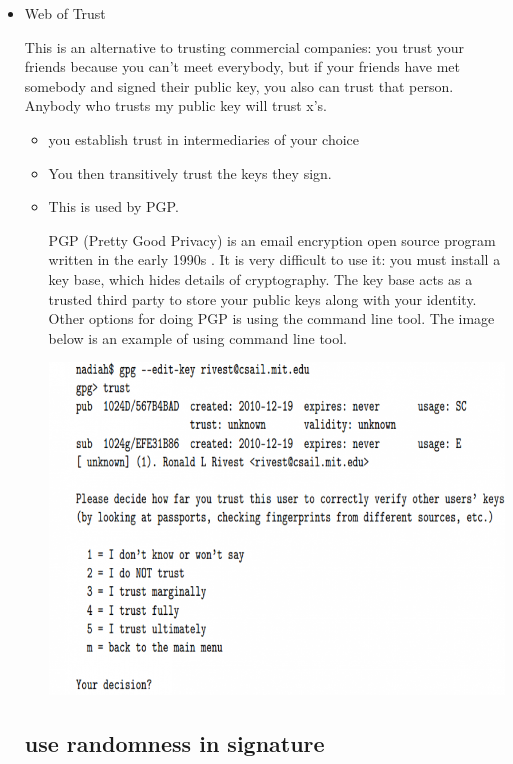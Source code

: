 \documentclass[11pt]{article} %
\begin{document}
{\begin{itemize}
  \item  Web of Trust

  This is an alternative to trusting commercial companies: you trust your friends because you can't meet everybody, but if your friends have met somebody and signed their public key, you also can trust that person. Anybody who trusts my public key will trust x’s.
  \begin{itemize}
  \item you establish trust in intermediaries of your choice

  \item You then transitively trust the keys they sign.
  \item This is used by PGP.

  PGP (Pretty Good Privacy) is an email encryption open source program written in the early 1990s . It is very difficult to use it: you must install a key base, which hides details of cryptography. The key base acts as a trusted third party to store your public keys along with your identity. Other options for doing PGP is using the command line tool. The image below is an example of using command line tool.

  \includegraphics[scale=0.45]{./Trust-in-keys2.png}
  
 
  \end{itemize}
  
  
\newpage
\subsection{use randomness in signature}


\end{itemize}}
\end{document}
